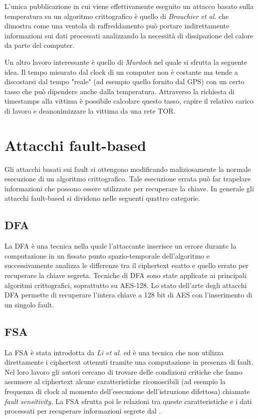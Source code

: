 		L'unica pubblicazione in cui viene effettivamente eseguito un attacco basato sulla temperatura su un algoritmo crittografico è quello di \emph{Brouchier et al.}\cite{brouchier2009temperature} che dimostra come una ventola di raffreddamento può portare indirettamente informazioni sui dati processati analizzando la necessità di dissipazione del calore da parte del computer.
		
		Un altro lavoro interessante è quello di \emph{Murdoch}\cite{murdoch2006hot} nel quale si sfrutta la seguente idea. Il tempo misurato dal clock di un computer non è costante ma tende a discostarsi dal tempo "reale" (ad esempio quello fornito dal \acs{GPS}) con un certo tasso che può dipendere anche dalla temperatura\cite{vig1992introduction}. Attraverso la richiesta di timestamps alla vittima è possibile calcolare questo tasso, capire il relativo carico di lavoro e deanonimizzare la vittima da una rete \acs{TOR}.
		
	\section{Attacchi fault-based}
		Gli attacchi basati sui fault si ottengono modificando maliziosamente la normale esecuzione di un algoritmo crittografico. Tale esecuzione errata può far trapelare informazioni che possono essere utilizzate per recuperare la chiave. In generale gli attacchi fault-based si dividono nelle seguenti quattro categorie\cite{patranabis2018fault}.
		
		\subsection*{\ac{DFA}}
			La \ac{DFA} è una tecnica nella quale l'attaccante inserisce un errore durante la computazione in un fissato punto spazio-temporale dell'algoritmo e successivamente analizza le differenze tra il ciphertext esatto e quello errato per recuperare la chiave segreta. Tecniche di \ac{DFA} sono state applicate ai principali algoritmi crittografici, soprattutto su \ac{AES}-128. Lo stato dell'arte degli attacchi \ac{DFA} permette di recuperare l'intera chiave a 128 bit di \ac{AES} con l'inserimento di un singolo fault\cite{tunstall2011differential}.
			
		\subsection*{\ac{FSA}}
			La \ac{FSA} è stata introdotta da \emph{Li et al.}\cite{li2010fault} ed è una tecnica che non utilizza direttamente i ciphertext ottenuti tramite una computazione in presenza di fault. Nel loro lavoro gli autori cercano di trovare delle condizioni critiche che fanno assumere al ciphertext alcune caratteristiche riconoscibili (ad esempio la frequenza di clock al momento dell'esecuzione dell'istruzione difettosa) chiamate \emph{fault sensitivity}. La \ac{FSA} sfrutta poi le relazioni tra queste caratteristiche e i dati processati per recuperare informazioni segrete dal \disps.
			
